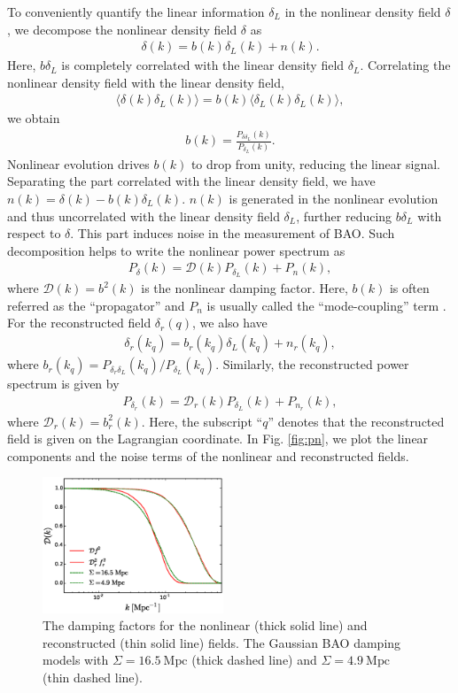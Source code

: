 \documentclass[aps,prd,twocolumn,showpacs,superscriptaddress,groupedaddress,nofootinbib]{revtex4}  %
\newcommand{\mr}{\mathrm}
\newcommand{\bea}{\begin{eqnarray}}
\newcommand{\eea}{\end{eqnarray}}
\begin{document}
To conveniently quantify the linear information $\delta_L$ in 
the nonlinear density field $\delta$, we decompose the nonlinear density field
$\delta$ as
\begin{eqnarray}
\delta({k})=b({k})\delta_L({k})+n({k}).
\end{eqnarray}
Here, $b\delta_L$ is completely correlated with the linear density field 
$\delta_L$. Correlating the nonlinear density field with the linear density 
field,  
\bea
\langle\delta(k)\delta_L(k)\rangle=b(k)\langle\delta_L(k)\delta_L(k)\rangle,
\eea
we obtain 
\bea
b(k)=\frac{P_{\delta\delta_L}(k)}{P_{\delta_L}(k)}.
\eea
Nonlinear evolution drives $b(k)$ to drop from unity, reducing the linear 
signal. Separating the part correlated with the linear density field, we have
$n(k)=\delta(k)-b(k)\delta_L(k)$.
$n(k)$ is generated in the nonlinear evolution and thus uncorrelated with
the linear density field $\delta_L$, further reducing $b\delta_L$ with respect
to $\delta$. This part induces noise in the measurement of BAO. 
Such decomposition helps to write the nonlinear power spectrum as
\bea
P_\delta(k)=\mathcal{D}(k)P_{\delta_L}(k)+P_{n}(k),
\eea
where $\mathcal{D}(k)=b^2(k)$ is the nonlinear damping factor.
Here, $b(k)$ is often referred as the ``propagator'' and $P_{n}$ is usually
called the ``mode-coupling'' term \cite{2006crocce,2008crocce,2008matsubara}.
For the reconstructed field $\delta_r(q)$, we also have
\bea
\delta_r(k_q)=b_r(k_q)\delta_L(k_q)+n_r(k_q),
\eea
where $b_r(k_q)={P_{\delta_r\delta_L}(k_q)}/{P_{\delta_L}(k_q)}$.
Similarly, the reconstructed power spectrum is given by
\bea
P_{\delta_r}(k)=\mathcal{D}_r(k)P_{\delta_L}(k)+P_{n_r}(k),
\eea
where $\mathcal{D}_r(k)=b^2_r(k)$.
Here, the subscript ``$q$'' denotes that the reconstructed field is given on the
Lagrangian coordinate.
In Fig. \ref{fig:pn}, we plot the linear components and the noise terms of
the nonlinear and reconstructed fields.

\begin{figure}[tbp]
\begin{center}
\includegraphics[width=0.48\textwidth]{f3.eps}
\end{center}
\vspace{-0.7cm}
\caption{The damping factors for the nonlinear (thick solid line) and 
reconstructed (thin solid line) fields. The Gaussian BAO damping models with 
$\Sigma=16.5\ \mr{Mpc}$ (thick dashed line) and $\Sigma=4.9\ \mr{Mpc}$ 
(thin dashed line).}
\label{fig:damp}
\end{figure}
\end{document}

